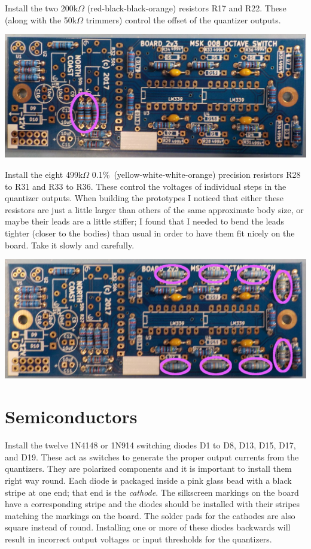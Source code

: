 Install the two 200k$\Omega$ (red-black-black-orange) resistors R17 and R22. 
These (along with the 50k$\Omega$ trimmers) control the offset of the
quantizer outputs.

\noindent\includegraphics[width=\linewidth]{res-200k.jpg}

Install the eight 499k$\Omega$ 0.1\%\ (yellow-white-white-orange) precision
resistors R28 to R31 and R33 to R36.  These control the voltages of
individual steps in the quantizer outputs.  When building the prototypes I
noticed that either these resistors are just a little larger than others of
the same approximate body size, or maybe their leads are a little stiffer; I
found that I needed to bend the leads tighter (closer to the bodies) than
usual in order to have them fit nicely on the board.  Take it slowly and
carefully.

\noindent\includegraphics[width=\linewidth]{res-499k.jpg}

\section{Semiconductors}

Install the twelve 1N4148 or 1N914 switching diodes D1 to D8, D13, D15, D17,
and D19.  These act as switches to generate the proper output currents from
the quantizers.  They are polarized components and it is important to
install them right way round.  Each diode is packaged inside a pink glass
bead with a black stripe at one end; that end is the \emph{cathode}.  The
silkscreen markings on the board have a corresponding stripe and the diodes
should be installed with their stripes matching the markings on the board. 
The solder pads for the cathodes are also square instead of round. 
Installing one or more of these diodes backwards will result in incorrect
output voltages or input thresholds for the quantizers.

